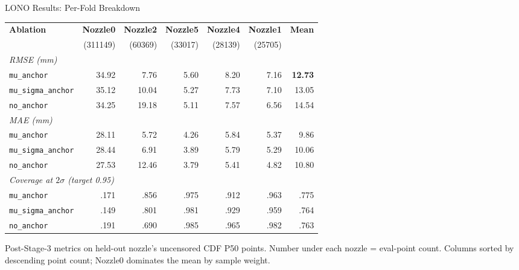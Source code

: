 \documentclass[UTF8,aspectratio=169]{ctexbeamer}
\newcommand{\good}[1]{\textcolor{green!45!black}{#1}}
\newcommand{\warn}[1]{\textcolor{red!65!black}{#1}}
\begin{document}
\begin{frame}{LONO Results: Per-Fold Breakdown}
\footnotesize
\begin{center}
\renewcommand{\arraystretch}{1.08}
\setlength{\tabcolsep}{4pt}
\begin{tabular}{@{}lrrrrr|r@{}}
\toprule
\textbf{Ablation} &
\textbf{Nozzle0} & \textbf{Nozzle2} & \textbf{Nozzle5} & \textbf{Nozzle4} & \textbf{Nozzle1} &
\textbf{Mean} \\
& \scriptsize(311149) & \scriptsize(60369) & \scriptsize(33017) & \scriptsize(28139) & \scriptsize(25705) & \\
\midrule
\multicolumn{7}{l}{\textit{RMSE (mm)}} \\
\rowcolor{winrow}
\texttt{mu\_anchor}        & 34.92 & \good{7.76} & 5.60 & 8.20 & 7.16 & \textbf{12.73} \\
\texttt{mu\_sigma\_anchor} & 35.12 & 10.04       & 5.27 & 7.73 & 7.10 & 13.05 \\
\rowcolor{warnrow}
\texttt{no\_anchor}        & 34.25 & \warn{19.18} & 5.11 & 7.57 & 6.56 & 14.54 \\
\midrule
\multicolumn{7}{l}{\textit{MAE (mm)}} \\
\texttt{mu\_anchor}        & 28.11 & 5.72  & 4.26 & 5.84 & 5.37 & 9.86 \\
\texttt{mu\_sigma\_anchor} & 28.44 & 6.91  & 3.89 & 5.79 & 5.29 & 10.06 \\
\texttt{no\_anchor}        & 27.53 & 12.46 & 3.79 & 5.41 & 4.82 & 10.80 \\
\midrule
\multicolumn{7}{l}{\textit{Coverage at $2\sigma$ (target 0.95)}} \\
\texttt{mu\_anchor}        & .171 & .856 & .975 & .912 & .963 & .775 \\
\texttt{mu\_sigma\_anchor} & .149 & .801 & .981 & .929 & .959 & .764 \\
\texttt{no\_anchor}        & .191 & .690 & .985 & .965 & .982 & .763 \\
\bottomrule
\end{tabular}
\end{center}

\vspace{0.1em}
\scriptsize
Post-Stage-3 metrics on held-out nozzle's uncensored CDF P50 points. Number under each
nozzle = eval-point count. Columns sorted by descending point count; Nozzle0 dominates the
mean by sample weight.
\end{frame}
\end{document}
